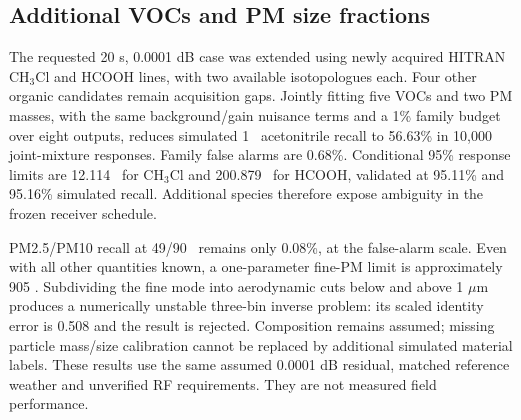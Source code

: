 \subsection{Additional VOCs and PM size fractions}
The requested 20 s, 0.0001 dB case was extended using newly acquired HITRAN CH$_3$Cl and HCOOH lines, with two available isotopologues each. Four other organic candidates remain acquisition gaps. Jointly fitting five VOCs and two PM masses, with the same background/gain nuisance terms and a 1\% family budget over eight outputs, reduces simulated 1 \ugm\ acetonitrile recall to 56.63\% in 10,000 joint-mixture responses. Family false alarms are 0.68\%. Conditional 95\% response limits are 12.114 \ugm\ for CH$_3$Cl and 200.879 \ugm\ for HCOOH, validated at 95.11\% and 95.16\% simulated recall. Additional species therefore expose ambiguity in the frozen receiver schedule.

PM2.5/PM10 recall at 49/90 \ugm\ remains only 0.08\%, at the false-alarm scale. Even with all other quantities known, a one-parameter fine-PM limit is approximately 905 \ugm. Subdividing the fine mode into aerodynamic cuts below and above 1 $\mu$m produces a numerically unstable three-bin inverse problem: its scaled identity error is 0.508 and the result is rejected. Composition remains assumed; missing particle mass/size calibration cannot be replaced by additional simulated material labels. These results use the same assumed 0.0001 dB residual, matched reference weather and unverified RF requirements. They are not measured field performance.
